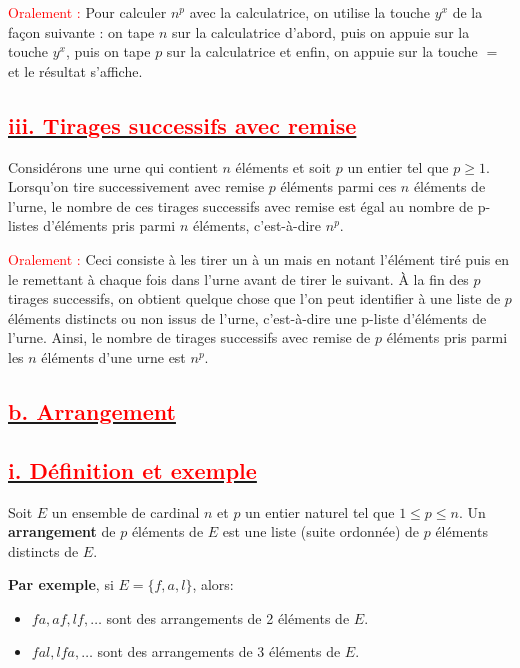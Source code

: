 \documentclass[12pt]{article}
\begin{document}
\textcolor{red}{Oralement :} Pour calculer \(n^{p}\) avec la calculatrice, on utilise la touche \(y^{x}\) de la façon suivante : on tape \(n\) sur la calculatrice d'abord, puis on appuie sur la touche \(y^{x}\), puis on tape \(p\) sur la calculatrice et enfin, on appuie sur la touche \(=\) et le résultat s’affiche.
\subsection*{\underline{\textbf{\textcolor{red}{iii. Tirages successifs avec remise}}}}
Considérons une urne qui contient \(n\) éléments et soit \(p\) un entier tel que \(p \geq 1\). Lorsqu'on tire successivement avec remise \(p\) éléments parmi ces \(n\) éléments de l’urne, le nombre de ces tirages successifs avec remise est égal au nombre de p-listes d’éléments pris parmi \(n\) éléments, c’est-à-dire \(n^{p}\).

\textcolor{red}{Oralement :} Ceci consiste à les tirer un à un mais en notant l’élément tiré puis en le remettant à chaque fois dans l’urne avant de tirer le suivant. À la fin des \(p\) tirages successifs, on obtient quelque chose que l’on peut identifier à une liste de \(p\) éléments distincts ou non issus de l’urne, c’est-à-dire une p-liste d’éléments de l’urne. Ainsi, le nombre de tirages successifs avec remise de \(p\) éléments pris parmi les \(n\) éléments d’une urne est \(n^{p}\).
\subsection*{\underline{\textbf{\textcolor{red}{b. Arrangement}}}}
\subsection*{\underline{\textbf{\textcolor{red}{i. Définition et exemple}}}}
Soit \( E \) un ensemble de cardinal \( n \) et \( p \) un entier naturel tel que \( 1 \leq p \leq n \). Un \textbf{arrangement} de \( p \) éléments de \( E \) est une liste (suite ordonnée) de \( p \) éléments distincts de \( E \).

\textbf{Par exemple}, si \( E = \{f, a, l\} \), alors:
\begin{itemize}
    \item \( fa, af, lf, \ldots \) sont des arrangements de 2 éléments de \( E \).
    \item \( fal, lfa, \ldots \) sont des arrangements de 3 éléments de \( E \).
\end{itemize}
\end{document}
